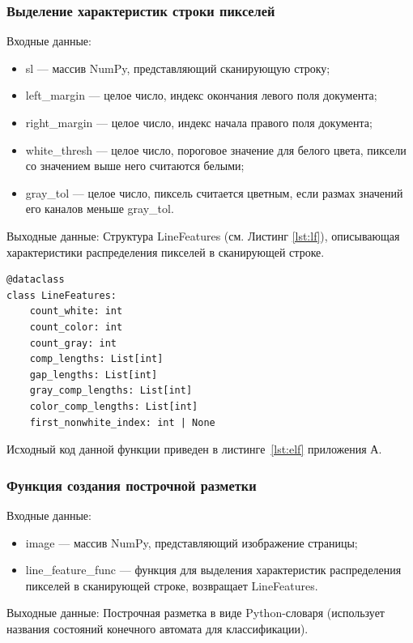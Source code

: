 \subsubsection{Выделение характеристик строки пикселей}
Входные данные:
\begin{itemize}
    \item sl --- массив NumPy, представляющий сканирующую строку;
    \item left\_margin --- целое число, индекс окончания левого поля документа;
    \item right\_margin --- целое число, индекс начала правого поля документа;
    \item white\_thresh --- целое число, пороговое значение для белого цвета, пиксели со значением выше него считаются белыми;
    \item gray\_tol --- целое число, пиксель считается цветным, если размах значений его каналов меньше gray\_tol.
\end{itemize}

Выходные данные: Структура LineFeatures (см. Листинг \ref{lst:lf}), описывающая характеристики распределения пикселей в сканирующей строке.

\begin{lstlisting}[caption={Структура LineFeatures}, label={lst:lf}]
@dataclass
class LineFeatures:
    count_white: int
    count_color: int
    count_gray: int
    comp_lengths: List[int]
    gap_lengths: List[int]
    gray_comp_lengths: List[int]
    color_comp_lengths: List[int]
    first_nonwhite_index: int | None
\end{lstlisting}

Исходный код данной функции приведен в листинге~\ref{lst:elf} приложения А.

\subsubsection{Функция создания построчной разметки} %
Входные данные:
\begin{itemize}
    \item image --- массив NumPy, представляющий изображение страницы;
    \item line\_feature\_func --- функция для выделения характеристик распределения пикселей в сканирующей строке, возвращает LineFeatures.
\end{itemize}

Выходные данные: Построчная разметка в виде Python-словаря (использует названия состояний конечного автомата для классификации).

